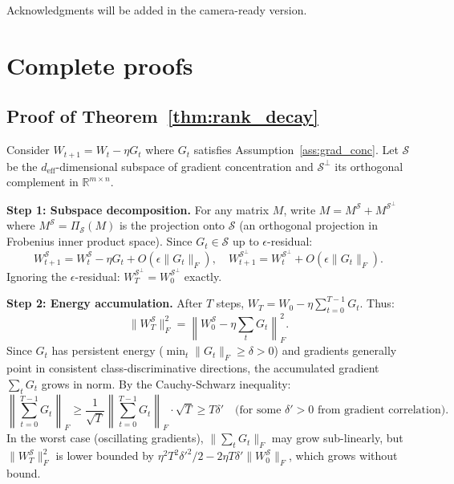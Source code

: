 \documentclass{article}
\newcommand{\RR}{\mathbb{R}}
\newcommand{\cS}{\mathcal{S}}
\begin{document}
\begin{ack}
Acknowledgments will be added in the camera-ready version.
\end{ack}





\appendix

\section{Complete proofs}
\label{app:proofs}

\subsection{Proof of Theorem~\ref{thm:rank_decay}}

Consider $W_{t+1} = W_t - \eta G_t$ where $G_t$ satisfies Assumption~\ref{ass:grad_conc}. Let $\cS$ be the $d_{\text{eff}}$-dimensional subspace of gradient concentration and $\cS^\perp$ its orthogonal complement in $\RR^{m\times n}$.

\textbf{Step 1: Subspace decomposition.} For any matrix $M$, write $M = M^{\cS} + M^{\cS^\perp}$ where $M^{\cS} = \Pi_{\cS}(M)$ is the projection onto $\cS$ (an orthogonal projection in Frobenius inner product space). Since $G_t \in \cS$ up to $\epsilon$-residual:
\[
W_{t+1}^{\cS} = W_t^{\cS} - \eta G_t + O(\epsilon\|G_t\|_F), \quad W_{t+1}^{\cS^\perp} = W_t^{\cS^\perp} + O(\epsilon\|G_t\|_F).
\]
Ignoring the $\epsilon$-residual: $W_T^{\cS^\perp} = W_0^{\cS^\perp}$ exactly.

\textbf{Step 2: Energy accumulation.} After $T$ steps, $W_T = W_0 - \eta \sum_{t=0}^{T-1} G_t$. Thus:
\[
\|W_T^{\cS}\|_F^2 = \left\|W_0^{\cS} - \eta \sum_t G_t\right\|_F^2.
\]
Since $G_t$ has persistent energy ($\min_t \|G_t\|_F \geq \delta > 0$) and gradients generally point in consistent class-discriminative directions, the accumulated gradient $\sum_t G_t$ grows in norm. By the Cauchy-Schwarz inequality:
\[
\left\|\sum_{t=0}^{T-1} G_t\right\|_F \geq \frac{1}{\sqrt{T}}\left\|\sum_{t=0}^{T-1} G_t\right\|_F \cdot \sqrt{T} \geq T\delta' \quad \text{(for some } \delta' > 0 \text{ from gradient correlation)}.
\]
In the worst case (oscillating gradients), $\|\sum_t G_t\|_F$ may grow sub-linearly, but $\|W_T^{\cS}\|_F^2$ is lower bounded by $\eta^2 T^2 \delta'^2 / 2 - 2\eta T\delta'\|W_0^{\cS}\|_F$, which grows without bound.
\end{document}
